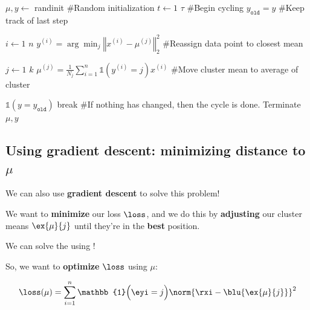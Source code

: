         \begin{codebox}
          \li $\mu, y \gets $ randinit  \qquad\#Random initialization
          \li \For $t \gets 1$ \To $\tau$   \qquad\#Begin cycling
          \li
          \li   \Do
                 $y_{\texttt{old}} = y$ \qquad\#Keep track of last step
                 
          \li
          \li        \For $i \gets 1$ \To $n$
          \li       \Do
                     $y^{(i)} = \arg\min_j \left\Vert x^{(i)} - \mu^{(j)} \right\Vert_2^2$
                     \qquad\#Reassign data point to closest mean
                    \End
                    
          \li
          \li    \For $j \gets 1$ \To $k$
          \li       \Do 
                     $\mu^{(j)} = \frac{1}{N_j} \sum_{i=1}^n \mathbb{1}(y^{(i)} = j) x^{(i)}$
                     \qquad\#Move cluster mean to average of cluster
                    \End
                    
        \li
          \li      \If $\mathbb{1}(y = y_{\texttt{old}})$
          \li          \Then
        		  break \qquad\#If nothing has changed, then the cycle is done. Terminate
              \End
              \End
          \li
          \li \Return $\mu, y$
        \end{codebox}
        
    \subsection{Using gradient descent: minimizing distance to $\mu$}
    
        We can also use \textbf{gradient descent} to solve this problem!
        
        We want to \textbf{minimize} our loss $\loss$, and we do this by \textbf{adjusting} our cluster means $\ex{\mu}{j}$ until they're in the \textbf{best} position.\\
        
        \begin{concept}
            We can solve the  using !
        \end{concept}
        
        So, we want to \textbf{optimize} $\loss$ using $\mu$:
        
        \begin{equation}
            \loss(\mu) =
            \sum_{i=1}^n 
                    \mathbb{1} \Big( \eyi = j \Big)
                    \norm{ \rxi - \blu{\ex{\mu}{j}} }^2 
        \end{equation}
        
